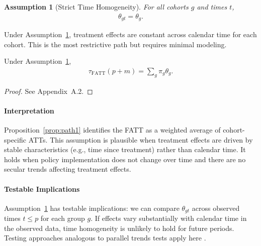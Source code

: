 \documentclass{article}
\newtheorem{assumption}{Assumption}
\begin{document}
\begin{assumption}[Strict Time Homogeneity]
\label{assump:strict-homogeneity}
For all cohorts $g$ and times $t$,
\begin{align}
\theta_{gt} = \theta_g.
\end{align}
\end{assumption}

Under Assumption~\ref{assump:strict-homogeneity}, treatment effects are constant across calendar time for each cohort. This is the most restrictive path but requires minimal modeling.

\begin{proposition}
\label{prop:path1}
Under Assumption~\ref{assump:strict-homogeneity},
\begin{align}
\tau_{\text{FATT}}(p+m) = \sum_g \pi_g \theta_g.
\end{align}
\end{proposition}

\begin{proof}
See Appendix~A.2.
\end{proof}

\paragraph{Interpretation}


Proposition~\ref{prop:path1} identifies the FATT as a weighted average of cohort-specific ATTs. This assumption is plausible when treatment effects are driven by stable characteristics (e.g., time since treatment) rather than calendar time. It holds when policy implementation does not change over time and there are no secular trends affecting treatment effects.

\paragraph{Testable Implications}


Assumption~\ref{assump:strict-homogeneity} has testable implications: we can compare $\theta_{gt}$ across observed times $t \leq p$ for each group $g$. If effects vary substantially with calendar time in the observed data, time homogeneity is unlikely to hold for future periods. Testing approaches analogous to parallel trends tests apply here \citep{detteTestingEquivalencePreTrends2024}.
\end{document}
